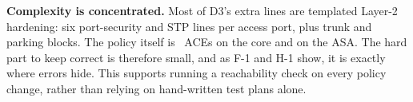 \textbf{Complexity is concentrated.}
Most of D3's extra lines are templated Layer-2 hardening: six port-security and STP lines per access port, plus trunk and parking blocks. The policy itself is \aceCoreDthree{}~ACEs on the core and \aceAsaDthree{} on the ASA. The hard part to keep correct is therefore small, and as F-1 and H-1 show, it is exactly where errors hide. This supports running a reachability check on every policy change, rather than relying on hand-written test plans alone.
